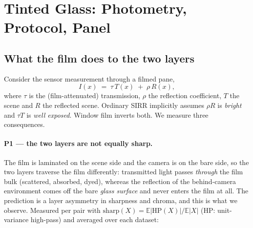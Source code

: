\section{Tinted Glass: Photometry, Protocol, Panel}
\label{sec:benchmark}

\subsection{What the film does to the two layers}
\label{sec:film}

Consider the sensor measurement through a filmed pane,
\begin{equation}
I(x) \;=\; \tau\,T(x) \;+\; \rho\,R(x),
\label{eq:film}
\end{equation}
where $\tau$ is the (film-attenuated) transmission, $\rho$ the reflection coefficient, $T$
the scene and $R$ the reflected scene. Ordinary SIRR implicitly assumes $\rho R$ is
\emph{bright} and $\tau T$ is \emph{well exposed}. Window film inverts both. We measure
three consequences.

\paragraph{P1 --- the two layers are not equally sharp.}
The film is laminated on the scene side and the camera is on the bare side, so the two layers
traverse the film differently: transmitted light passes \emph{through} the film bulk (scattered,
absorbed, dyed), whereas the reflection of the behind-camera environment comes off the bare
\emph{glass surface} and never enters the film at all. The prediction is a layer
asymmetry in sharpness and chroma, and this is what we observe. Measured per pair with
$\mathrm{sharp}(X)=\mathbb{E}|\mathrm{HP}(X)|/\mathbb{E}|X|$ (HP: unit-variance high-pass) and
averaged over each dataset:

